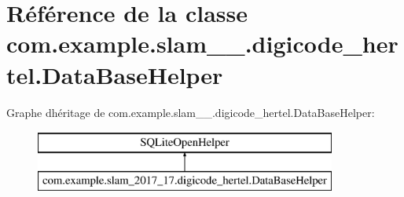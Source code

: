 \hypertarget{classcom_1_1example_1_1slam__2017__17_1_1digicode__hertel_1_1_data_base_helper}{}\section{Référence de la classe com.\+example.\+slam\+\_\+\_.\+digicode\+\_\+hertel.\+Data\+Base\+Helper}
\label{classcom_1_1example_1_1slam__2017__17_1_1digicode__hertel_1_1_data_base_helper}
Graphe d\textquotesingle{}héritage de com.\+example.\+slam\+\_\+\_.\+digicode\+\_\+hertel.\+Data\+Base\+Helper\+:\begin{figure}[H]
\begin{center}
\leavevmode
\includegraphics[height=2.000000cm]{classcom_1_1example_1_1slam__2017__17_1_1digicode__hertel_1_1_data_base_helper}
\end{center}
\end{figure}
